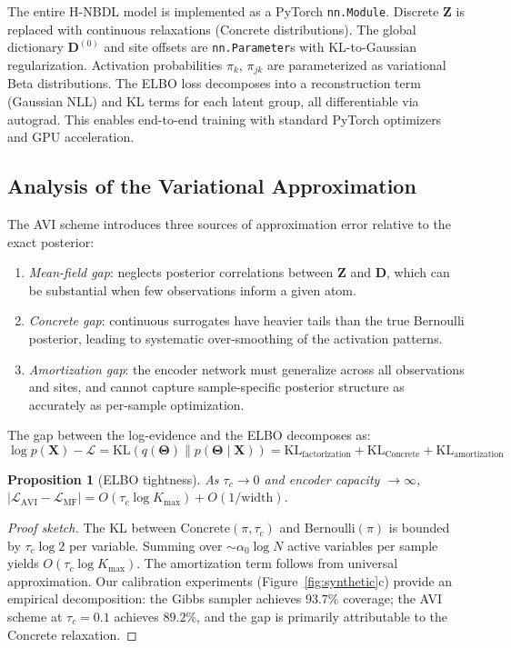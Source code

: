 \documentclass[11pt,a4paper]{article}
\newtheorem{proposition}{Proposition}
\theoremstyle{definition}
\begin{document}
The entire H-NBDL model is implemented as a PyTorch \texttt{nn.Module}. Discrete $\mathbf{Z}$ is replaced with continuous relaxations (Concrete distributions). The global dictionary $\mathbf{D}^{(0)}$ and site offsets are \texttt{nn.Parameter}s with KL-to-Gaussian regularization. Activation probabilities $\pi_k$, $\pi_{jk}$ are parameterized as variational Beta distributions. The ELBO loss decomposes into a reconstruction term (Gaussian NLL) and KL terms for each latent group, all differentiable via autograd. This enables end-to-end training with standard PyTorch optimizers and GPU acceleration.

\subsection{Analysis of the Variational Approximation}\label{sec:avi_analysis}

The AVI scheme introduces three sources of approximation error relative to the exact posterior:
\begin{enumerate}[nosep]
  \item \emph{Mean-field gap}: neglects posterior correlations between $\mathbf{Z}$ and $\mathbf{D}$, which can be substantial when few observations inform a given atom.
  \item \emph{Concrete gap}: continuous surrogates have heavier tails than the true Bernoulli posterior, leading to systematic over-smoothing of the activation patterns.
  \item \emph{Amortization gap}: the encoder network must generalize across all observations and sites, and cannot capture sample-specific posterior structure as accurately as per-sample optimization.
\end{enumerate}

The gap between the log-evidence and the ELBO decomposes as:
\begin{equation}
  \log p(\mathbf{X}) - \mathcal{L} = \mathrm{KL}(q(\boldsymbol{\Theta}) \| p(\boldsymbol{\Theta} \mid \mathbf{X})) = \mathrm{KL}_{\text{factorization}} + \mathrm{KL}_{\text{Concrete}} + \mathrm{KL}_{\text{amortization}} \label{eq:gap}
\end{equation}

\begin{proposition}[ELBO tightness]\label{prop:elbo}
As $\tau_c \to 0$ and encoder capacity $\to \infty$, $|\mathcal{L}_{\mathrm{AVI}} - \mathcal{L}_{\mathrm{MF}}| = O(\tau_c \log K_{\max}) + O(1/\mathrm{width})$.
\end{proposition}
\begin{proof}[Proof sketch]
The KL between $\text{Concrete}(\pi, \tau_c)$ and $\text{Bernoulli}(\pi)$ is bounded by $\tau_c \log 2$ per variable. Summing over $\sim \alpha_0 \log N$ active variables per sample yields $O(\tau_c \log K_{\max})$. The amortization term follows from universal approximation. Our calibration experiments (Figure~\ref{fig:synthetic}c) provide an empirical decomposition: the Gibbs sampler achieves $93.7\%$ coverage; the AVI scheme at $\tau_c{=}0.1$ achieves $89.2\%$, and the gap is primarily attributable to the Concrete relaxation.
\end{proof}
\end{document}
